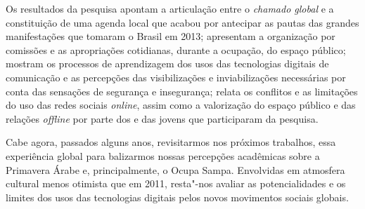 Os resultados da pesquisa apontam a articulação entre o \textit{chamado global} e a constituição de uma agenda local que acabou por antecipar
as pautas das grandes manifestações que tomaram o Brasil em 2013;
apresentam a organização por comissões e as apropriações cotidianas,
durante a ocupação, do espaço público; mostram os processos de
aprendizagem dos usos das tecnologias digitais de comunicação e as
percepções das visibilizações e inviabilizações necessárias por conta
das sensações de segurança e insegurança; relata os conflitos e as
limitações do uso das redes sociais \textit{online}, assim como a
valorização do espaço público e das relações \textit{offline} por parte
dos e das jovens que participaram da pesquisa.

Cabe agora, passados alguns anos, revisitarmos nos próximos trabalhos,
essa experiência global para balizarmos nossas percepções acadêmicas
sobre a Primavera Árabe e, principalmente, o Ocupa Sampa. Envolvidas
em atmosfera cultural menos otimista que em 2011, resta"-nos avaliar as
potencialidades e os limites dos usos das tecnologias digitais pelos
novos movimentos sociais globais.


